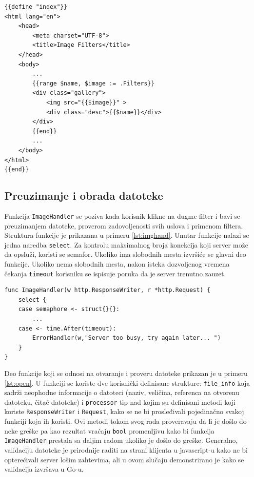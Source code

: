 \documentclass[12pt,oneside]{memoir}
\begin{document}
\begin{center}
\begin{lstlisting}[caption=Izgled HTML šablona,label={lst:tmpl2},  backgroundcolor=\color{background}]
{{define "index"}}
<html lang="en">
	<head>
		<meta charset="UTF-8">
		<title>Image Filters</title>
	</head>
	<body>
		...
		{{range $name, $image := .Filters}}
		<div class="gallery">
			<img src="{{$image}}" >
			<div class="desc">{{$name}}</div>
		</div>
		{{end}}
		...
	</body>
</html>
{{end}}
\end{lstlisting}
\end{center}

\subsection{Preuzimanje i obrada datoteke}\label{appFile}

Funkcija \texttt{ImageHandler} se poziva kada korisnik klikne na dugme filter i bavi se preuzimanjem datoteke, proverom zadovoljenosti svih uslova i primenom filtera. Struktura funkcije je prikazana u primeru \ref{lst:imghand}. Unutar funkcije nalazi se jedna naredba \texttt{select}. Za kontrolu maksimalnog broja konekcija koji server može da opsluži, koristi se semafor. Ukoliko ima slobodnih mesta izvršiće se glavni deo funkcije. Ukoliko nema slobodnih mesta, nakon isteka dozvoljenog vremena čekanja \texttt{timeout} korisniku se ispisuje poruka da je server trenutno zauzet. 
 
\begin{center}
\begin{lstlisting}[caption=Struktura funkcije ImageHandler,label={lst:imghand},  backgroundcolor=\color{background}]
func ImageHandler(w http.ResponseWriter, r *http.Request) {
	select {
	case semaphore <- struct{}{}:
		...
	case <- time.After(timeout):
		ErrorHandler(w,"Server too busy, try again later... ")
	}
}

\end{lstlisting}
\end{center}

Deo funkcije koji se odnosi na otvaranje i proveru datoteke prikazan je u primeru \ref{lst:open}. U funkciji se koriste dve korisnički definisane strukture: \texttt{file\_info} koja sadrži neophodne informacije o datoteci (naziv, veličina, referenca na otvorenu datoteku, čitač datoteke) i \texttt{processor} tip nad kojim su definisani metodi koji koriste \texttt{ResponseWriter} i \texttt{Request}, kako se ne bi prosleđivali pojedinačno svakoj funkciji koja ih koristi. Ovi metodi tokom svog rada proveravaju da li je došlo do neke greške pa kao rezultat vraćaju \texttt{bool} promenljivu kako bi funkcija \texttt{ImageHandler} prestala sa daljim radom ukoliko je došlo do greške. Generalno, validaciju datoteke je prirodnije raditi na strani klijenta u javascript-u kako ne bi opterećivali server lošim zahtevima, ali u ovom slučaju demonstrirano je kako se validacija izvršava u Go-u.
\end{document}
